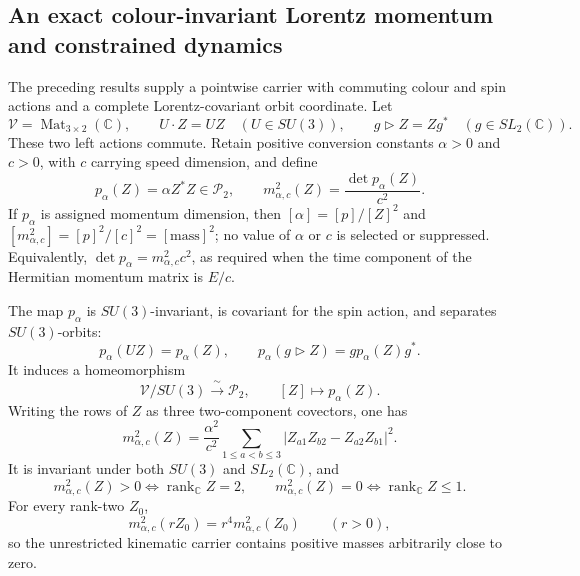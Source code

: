 \subsection{An exact colour-invariant Lorentz momentum and constrained dynamics}
\label{hlob:subsec:physical-translation}

The preceding results supply a pointwise carrier with commuting colour and
spin actions and a complete Lorentz-covariant orbit coordinate.  Let
\begin{equation}
 \mathscr V=\operatorname{Mat}_{3\times2}(\mathbb C),\qquad
 U\cdot Z=UZ\quad(U\in SU(3)),\qquad
 g\triangleright Z=Zg^*\quad(g\in SL_2(\mathbb C)).
 \label{hlob:eq:commuting-actions}
\end{equation}
These two left actions commute.  Retain positive conversion constants
\(\alpha>0\) and \(c>0\), with \(c\) carrying speed dimension, and define
\begin{equation}
 p_\alpha(Z)=\alpha Z^*Z\in\mathcal P_2,\qquad
 m_{\alpha,c}^2(Z)=\frac{\det p_\alpha(Z)}{c^2}.
 \label{hlob:eq:momentum-map}
\end{equation}
If \(p_\alpha\) is assigned momentum dimension, then
\([\alpha]=[p]/[Z]^2\) and
\([m_{\alpha,c}^2]=[p]^2/[c]^2=[\mathrm{mass}]^2\); no value of
\(\alpha\) or \(c\) is selected or suppressed.  Equivalently,
\(\det p_\alpha=m_{\alpha,c}^2c^2\), as required when the time component
of the Hermitian momentum matrix is \(E/c\).

\begin{theorem}
\label{hlob:thm:colour-momentum}
The map \(p_\alpha\) is \(SU(3)\)-invariant, is covariant for the spin action,
and separates \(SU(3)\)-orbits:
\begin{equation}
 p_\alpha(UZ)=p_\alpha(Z),\qquad
 p_\alpha(g\triangleright Z)=g p_\alpha(Z)g^*.
 \label{hlob:eq:momentum-covariance}
\end{equation}
It induces a homeomorphism
\begin{equation}
 \mathscr V/SU(3)\xrightarrow{\ \sim\ }\mathcal P_2,
 \qquad [Z]\longmapsto p_\alpha(Z).
 \label{hlob:eq:momentum-quotient}
\end{equation}
Writing the rows of \(Z\) as three two-component covectors, one has
\begin{equation}
 \boxed{
 m_{\alpha,c}^2(Z)
 =\frac{\alpha^2}{c^2}\sum_{1\leq a<b\leq3}
 |Z_{a1}Z_{b2}-Z_{a2}Z_{b1}|^2.}
 \label{hlob:eq:mass-pluecker}
\end{equation}
It is invariant under both \(SU(3)\) and \(SL_2(\mathbb C)\), and
\begin{equation}
 m_{\alpha,c}^2(Z)>0\Longleftrightarrow\operatorname{rank}_{\mathbb C}Z=2,
 \qquad
 m_{\alpha,c}^2(Z)=0\Longleftrightarrow\operatorname{rank}_{\mathbb C}Z\leq1.
 \label{hlob:eq:mass-rank}
\end{equation}
For every rank-two \(Z_0\),
\begin{equation}
 m_{\alpha,c}^2(rZ_0)=r^4m_{\alpha,c}^2(Z_0)
 \qquad(r>0),
 \label{hlob:eq:mass-scaling}
\end{equation}
so the unrestricted kinematic carrier contains positive masses arbitrarily
close to zero.
\end{theorem}

